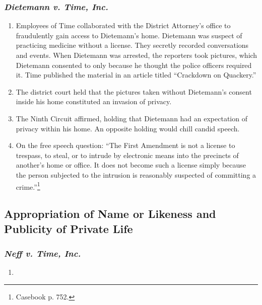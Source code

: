 \subsubsection{\emph{Dietemann v. Time, Inc.}}

\begin{enumerate}
    \item Employees of Time collaborated with the District Attorney's office 
    to fraudulently gain access to Dietemann's home. Dietemann was suspect of 
    practicing medicine without a license. They secretly recorded 
    conversations and events. When Dietemann was arrested, the reporters took 
    pictures, which Dietemann consented to only because he thought the police 
    officers required it. Time published the material in an article titled 
    ``Crackdown on Quackery.''
    \item The district court held that the pictures taken without Dietemann's 
    consent inside his home constituted an invasion of privacy.
    \item The Ninth Circuit affirmed, holding that Dietemann had an 
    expectation of privacy within his home. An opposite holding would chill 
    candid speech.
    \item On the free speech question: ``The First Amendment is not a license 
    to trespass, to steal, or to intrude by electronic means into the 
    precincts of another's home or office. It does not become such a license 
    simply because the person subjected to the intrusion is reasonably 
    suspected of committing a crime.''\footnote{Casebook p. 752.}
\end{enumerate}

\subsection{Appropriation of Name or Likeness and Publicity of Private Life}



\subsubsection{\emph{Neff v. Time, Inc.}}

\begin{enumerate}
    \item %
\end{enumerate}


